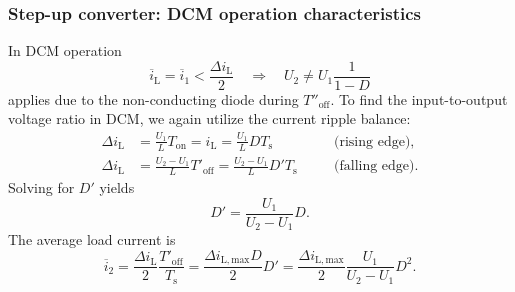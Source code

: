 \begin{frame}
    \frametitle{Step-up converter: DCM operation characteristics}
    In DCM operation 
    $$  \overline{i}_\mathrm{L}=\overline{i}_1 < \frac{\Delta i_\mathrm{L}}{2} \quad \Rightarrow \quad U_2 \neq U_1 \frac{1}{1-D}$$
    applies due to the non-conducting diode during  $T''_\mathrm{off}$. To find the input-to-output voltage ratio in DCM, we again utilize the current ripple balance:
    \begin{equation}
        \begin{alignedat}{2}
            \Delta i_\mathrm{L} &= \frac{U_1}{L}T_\mathrm{on} = i_\mathrm{L} = \frac{U_1}{L}DT_\mathrm{s} \quad &&\mbox{(rising edge)},\\
            \Delta i_\mathrm{L} &= \frac{U_2-U_1}{L}T'_\mathrm{off} = \frac{U_2-U_1}{L}D'T_\mathrm{s} \quad &&\mbox{(falling edge)}.
        \end{alignedat}
    \end{equation}
    Solving for $D'$ yields
    \begin{equation}
        D' = \frac{U_1}{U_2-U_1}D.
    \end{equation}
    The average load current is 
    \begin{equation}
            \overline{i}_2 = \frac{\Delta i_\mathrm{L}}{2}\frac{T'_\mathrm{off}}{T_\mathrm{s}} = \frac{\Delta i_\mathrm{L,max}D}{2}D'= \frac{\Delta i_\mathrm{L,max}}{2}\frac{U_1}{U_2-U_1}D^2.
            \label{eq:step-up-converter-average-output-current-DCM}
    \end{equation}
\end{frame}

